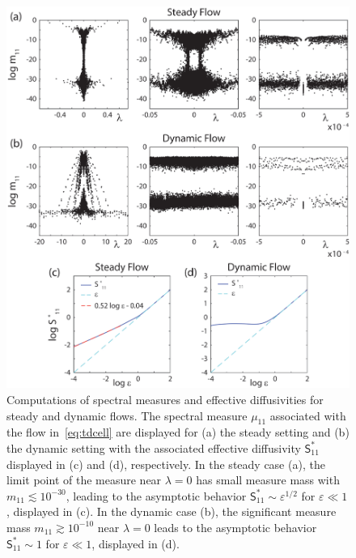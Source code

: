 \documentclass[leqno,onefignum,onetabnum]{siamltex1213}
\newcommand{\Sm}{\mathsf{S}}
\begin{document}
%
\begin{figure}[t]
  \centerline{\includegraphics[scale=0.75]{Figure1_Spectral_Measures_Effective_Diffusivities}} 
\caption{%
  Computations of spectral measures and effective diffusivities for
  steady and dynamic flows. The spectral measure $\mu_{11}$ associated
  with the flow in~\eqref{eq:tdcell} are displayed for (a) the steady
  setting and (b) the dynamic setting with the associated effective
  diffusivity $\Sm^*_{11}$ displayed in (c) and (d), respectively. In
  the steady case (a), the 
  limit point of the measure near $\lambda=0$ has small measure mass with
  $m_{11}\lesssim10^{-30}$, leading to the asymptotic behavior
  $\Sm^*_{11}\sim\varepsilon^{1/2}$ for $\varepsilon\ll1$, displayed in (c). In the dynamic case
  (b), the significant measure mass $m_{11}\gtrsim10^{-10}$
  near $\lambda=0$ leads to the asymptotic behavior
  $\Sm^*_{11}\sim1$ for $\varepsilon\ll1$, displayed in (d).
        }
\label{fig:Fig1_Spect_Meas_Eff_Diffus}
\end{figure}
%
\end{document}

